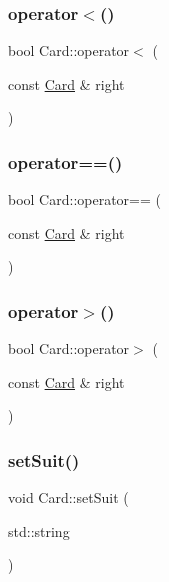 \subsubsection{\texorpdfstring{operator$<$()}{operator<()}}
{\footnotesize\ttfamily bool Card\+::operator$<$ (\begin{DoxyParamCaption}\item[{const \mbox{\hyperlink{class_card}{Card}} \&}]{right }\end{DoxyParamCaption})}

\mbox{\label{class_card_ac1b1dcac4434f8cc98719bad7c1d18a3}} 
\subsubsection{\texorpdfstring{operator==()}{operator==()}}
{\footnotesize\ttfamily bool Card\+::operator== (\begin{DoxyParamCaption}\item[{const \mbox{\hyperlink{class_card}{Card}} \&}]{right }\end{DoxyParamCaption})}

\mbox{\label{class_card_aa3f8343a4851dadfccffabb328da5213}} 
\subsubsection{\texorpdfstring{operator$>$()}{operator>()}}
{\footnotesize\ttfamily bool Card\+::operator$>$ (\begin{DoxyParamCaption}\item[{const \mbox{\hyperlink{class_card}{Card}} \&}]{right }\end{DoxyParamCaption})}

\mbox{\label{class_card_a9a6a690f4520a415de2043d8a59eae77}} 
\subsubsection{\texorpdfstring{set\+Suit()}{setSuit()}}
{\footnotesize\ttfamily void Card\+::set\+Suit (\begin{DoxyParamCaption}\item[{std\+::string}]{ }\end{DoxyParamCaption})}

